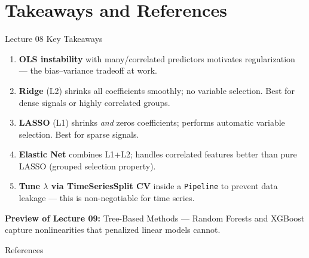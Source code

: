 \documentclass[aspectratio=169, 10pt]{beamer}
\begin{document}
\section{Takeaways and References}

\begin{frame}{Lecture 08 Key Takeaways}
  \begin{keybox}
    \begin{enumerate}
      \item \textbf{OLS instability} with many/correlated predictors motivates
            regularization — the bias--variance tradeoff at work.
      \item \textbf{Ridge} (L2) shrinks all coefficients smoothly; no variable selection.
            Best for dense signals or highly correlated groups.
      \item \textbf{LASSO} (L1) shrinks \emph{and} zeros coefficients; performs
            automatic variable selection. Best for sparse signals.
      \item \textbf{Elastic Net} combines L1+L2; handles correlated features better
            than pure LASSO (grouped selection property).
      \item \textbf{Tune $\lambda$ via TimeSeriesSplit CV} inside a \texttt{Pipeline}
            to prevent data leakage — this is non-negotiable for time series.
    \end{enumerate}
  \end{keybox}

  \medskip
  \textbf{Preview of Lecture 09:} Tree-Based Methods — Random Forests and XGBoost
  capture nonlinearities that penalized linear models cannot.
\end{frame}

\begin{frame}{References}
  \printbibliography[heading=none]
\end{frame}

\end{document}
